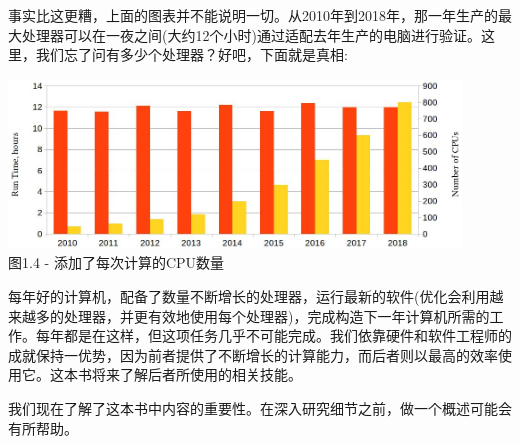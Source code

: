 事实比这更糟，上面的图表并不能说明一切。从2010年到2018年，那一年生产的最大处理器可以在一夜之间(大约12个小时)通过适配去年生产的电脑进行验证。这里，我们忘了问有多少个处理器？好吧，下面就是真相:

\begin{center}
\includegraphics[width=0.9\textwidth]{content/1/chapter1/images/4.jpg}\\
图1.4 - 添加了每次计算的CPU数量
\end{center}

每年好的计算机，配备了数量不断增长的处理器，运行最新的软件(优化会利用越来越多的处理器，并更有效地使用每个处理器)，完成构造下一年计算机所需的工作。每年都是在这样，但这项任务几乎不可能完成。我们依靠硬件和软件工程师的成就保持一优势，因为前者提供了不断增长的计算能力，而后者则以最高的效率使用它。这本书将来了解后者所使用的相关技能。

我们现在了解了这本书中内容的重要性。在深入研究细节之前，做一个概述可能会有所帮助。


















